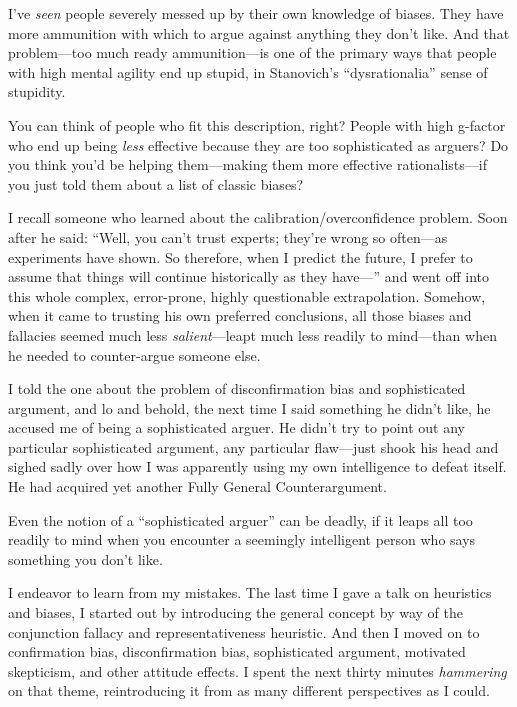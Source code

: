 {
 I've \textit{seen} people severely messed up by
their own knowledge of biases. They have more ammunition with which to
argue against anything they don't like. And that
problem---too much ready ammunition---is one of the primary ways that
people with high mental agility end up stupid, in
Stanovich's
``dysrationalia'' sense of
stupidity.}

{
 You can think of people who fit this description, right? People
with high g-factor who end up being \textit{less} effective because
they are too sophisticated as arguers? Do you think
you'd be helping them---making them more effective
rationalists---if you just told them about a list of classic biases?}

{
 I recall someone who learned about the calibration/overconfidence
problem. Soon after he said: ``Well, you
can't trust experts; they're wrong so
often---as experiments have shown. So therefore, when I predict the
future, I prefer to assume that things will continue historically as
they have---'' and went off into this whole complex,
error-prone, highly questionable extrapolation. Somehow, when it came
to trusting his own preferred conclusions, all those biases and
fallacies seemed much less \textit{salient}{}---leapt much less readily
to mind---than when he needed to counter-argue someone else.}

{
 I told the one about the problem of disconfirmation bias and
sophisticated argument, and lo and behold, the next time I said
something he didn't like, he accused me of being a
sophisticated arguer. He didn't try to point out any
particular sophisticated argument, any particular flaw---just shook his
head and sighed sadly over how I was apparently using my own
intelligence to defeat itself. He had acquired yet another Fully
General Counterargument.}

{
 Even the notion of a ``sophisticated
arguer'' can be deadly, if it leaps all too readily
to mind when you encounter a seemingly intelligent person who says
something you don't like.}

{
 I endeavor to learn from my mistakes. The last time I gave a talk
on heuristics and biases, I started out by introducing the general
concept by way of the conjunction fallacy and representativeness
heuristic. And then I moved on to confirmation bias, disconfirmation
bias, sophisticated argument, motivated skepticism, and other attitude
effects. I spent the next thirty minutes \textit{hammering} on that
theme, reintroducing it from as many different perspectives as I
could.}

